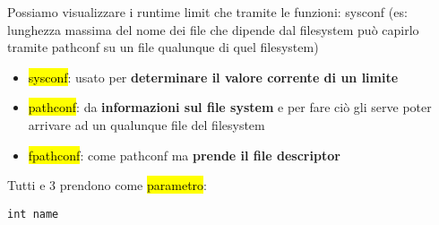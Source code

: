 Possiamo visualizzare i runtime limit che tramite le funzioni: sysconf (es: lunghezza massima del nome dei file che dipende dal filesystem può capirlo tramite pathconf su un file qualunque di quel filesystem)

\begin{itemize}
	\item \hl{sysconf}: usato per \textbf{determinare il valore corrente di un limite}
	
	\item \hl{pathconf}: da \textbf{informazioni sul file system} e per fare ciò gli serve poter arrivare ad un qualunque file del filesystem
	
	\item \hl{fpathconf}: come pathconf ma \textbf{prende il file descriptor}
\end{itemize}

Tutti e 3 prendono come \hl{parametro}:

\begin{lstlisting}
int name
\end{lstlisting}

